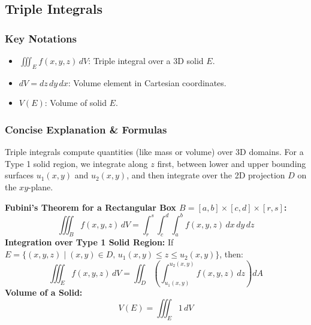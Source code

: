 \documentclass[11pt]{article}
\begin{document}
\subsection{Triple Integrals}
\subsubsection*{Key Notations}
\begin{itemize}
    \item $\iiint_E f(x,y,z)\,dV$: Triple integral over a 3D solid $E$.
    \item $dV = dz\,dy\,dx$: Volume element in Cartesian coordinates.
    \item $V(E)$: Volume of solid $E$.
\end{itemize}

\subsubsection*{Concise Explanation \& Formulas}
Triple integrals compute quantities (like mass or volume) over 3D domains. For a Type 1 solid region, we integrate along $z$ first, between lower and upper bounding surfaces $u_1(x,y)$ and $u_2(x,y)$, and then integrate over the 2D projection $D$ on the $xy$-plane.
\begin{formulabox}
    \textbf{Fubini's Theorem for a Rectangular Box $B = [a,b] \times [c,d] \times [r,s]$:}
    \[ \iiint_B f(x,y,z)\,dV = \int_r^s \int_c^d \int_a^b f(x,y,z)\,dx\,dy\,dz \]
    \textbf{Integration over Type 1 Solid Region:}
    If $E = \{(x,y,z) \mid (x,y) \in D, \, u_1(x,y) \le z \le u_2(x,y)\}$, then:
    \[ \iiint_E f(x,y,z)\,dV = \iint_D \left( \int_{u_1(x,y)}^{u_2(x,y)} f(x,y,z)\,dz \right) dA \]
    \textbf{Volume of a Solid:}
    \[ V(E) = \iiint_E 1\,dV \]
\end{formulabox}
\end{document}
